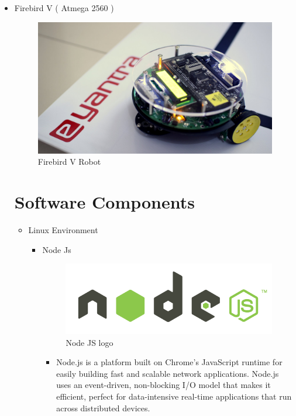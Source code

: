 \documentclass[a4paper,12pt,oneside]{book}
\begin{document}
\begin{itemize}
\begin{itemize}
    \end{itemize}
  
  \item Firebird V ( Atmega 2560 )
  \begin{figure}[h]
    \centering
	\includegraphics[scale=0.1]{firebird.jpg}
	\caption{Firebird V Robot}
	\end{figure}
  
  
  \newpage
\section{Software Components}
  
  
  \begin{itemize}
  \item Linux Environment 
    \begin{itemize}
     \item Node Js
   
    \begin{figure}[h]
    \centering
	\includegraphics[scale=0.4]{nodejs.png}
	\caption{Node JS logo}
	\end{figure}
   
    \begin{itemize}
    \item Node.js is a platform built on Chrome's JavaScript runtime for easily building fast and scalable network applications. Node.js uses an event-driven, non-blocking I/O model that makes it efficient, perfect for data-intensive real-time applications that run across distributed devices.
	

\end{itemize}
\end{itemize}
\end{itemize}
\end{itemize}
\end{document}
